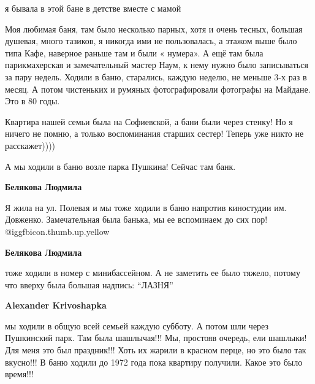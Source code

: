  
 
 
 
 


я бывала в этой бане в детстве вместе с мамой


Моя любимая баня, там было несколько парных, хотя и очень тесных, большая
душевая, много тазиков, я никогда ими не пользовалась, а этажом выше было
типа Кафе, наверное раньше там и были « нумера». А ещё там была парикмахерская
и замечательный мастер Наум, к нему нужно было записываться за пару недель.
Ходили в баню, старались, каждую неделю, не меньше 3-х раз в месяц. А потом
чистеньких и румяных фотографировали фотографы на Майдане. Это в 80 годы.


Квартира нашей семьи была на Софиевской, а бани были через стенку! Но я ничего
не помню, а только воспоминания старших сестер! Теперь уже никто не
расскажет))))


А мы ходили в баню возле парка Пушкина! Сейчас там банк.

\textbf{Белякова Людмила} 

Я жила на ул. Полевая и мы тоже ходили в баню напротив киностудии им. Довженко.
Замечательная была банька, мы ее вспоминаем до сих пор! @igg{fbicon.thumb.up.yellow} 

\textbf{Белякова Людмила} 

тоже ходили в номер с минибассейном. А не заметить ее было тяжело, потому что
вверху была большая надпись: \enquote{ЛАЗНЯ}

\textbf{Alexander Krivoshapka} 

мы ходили в общую всей семьей каждую субботу. А потом шли через Пушкинский
парк. Там была шашлычая!!! Мы, простояв очередь, ели шашлыки! Для меня это был
праздник!!! Хоть их жарили в красном перце, но это было так вкусно!!! В баню
ходили до 1972 года пока квартиру получили. Какое это было время!!!

